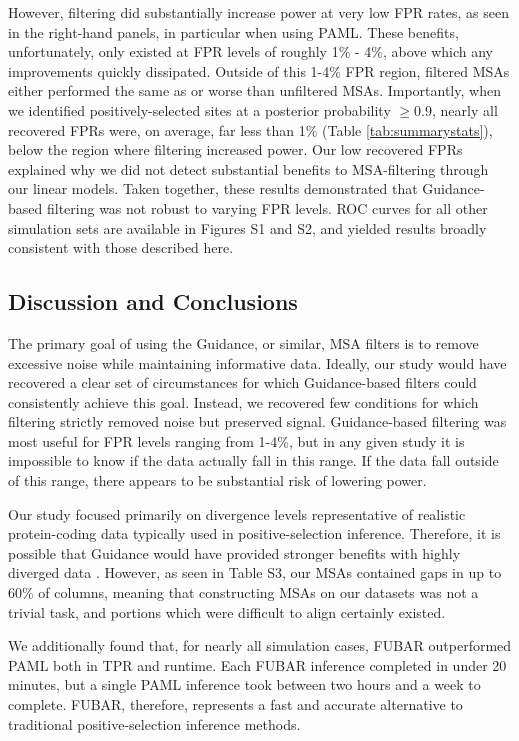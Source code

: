 \documentclass[11pt]{article}
\begin{document}
However, filtering did substantially increase power at very low FPR rates, as seen in the right-hand panels, in particular when using PAML. These benefits, unfortunately, only existed at FPR levels of roughly 1\% - 4\%, above which any improvements quickly dissipated. Outside of this 1-4\% FPR region, filtered MSAs either performed the same as or worse than unfiltered MSAs. Importantly, when we identified positively-selected sites at a posterior probability $\geq 0.9$, nearly all recovered FPRs were, on average, far less than 1\% (Table \ref{tab:summarystats}), below the region where filtering increased power. Our low recovered FPRs explained why we did not detect substantial benefits to MSA-filtering through our linear models. Taken together, these results demonstrated that Guidance-based filtering was not robust to varying FPR levels. ROC curves for all other simulation sets are available in Figures S1 and S2, and yielded results broadly consistent with those described here.

\subsection*{Discussion and Conclusions}

The primary goal of using the Guidance, or similar, MSA filters is to remove excessive noise while maintaining informative data. Ideally, our study would have recovered a clear set of circumstances for which Guidance-based filters could consistently achieve this goal. Instead, we recovered few conditions for which filtering strictly removed noise but preserved signal. Guidance-based filtering was most useful for FPR levels ranging from 1-4\%, but in any given study it is impossible to know if the data actually fall in this range. If the data fall outside of this range, there appears to be substantial risk of lowering power.

Our study focused primarily on divergence levels representative of realistic protein-coding data typically used in positive-selection inference. Therefore, it is possible that Guidance would have provided stronger benefits with highly diverged data \citep{Privman2012}. However, as seen in Table S3, our MSAs contained gaps in up to 60\% of columns, meaning that constructing MSAs on our datasets was not a trivial task, and portions which were difficult to align certainly existed.

We additionally found that, for nearly all simulation cases, FUBAR outperformed PAML both in TPR and runtime. Each FUBAR inference completed in under 20 minutes, but a single PAML inference took between two hours and a week to complete. FUBAR, therefore, represents a fast and accurate alternative to traditional positive-selection inference methods.
\end{document}
